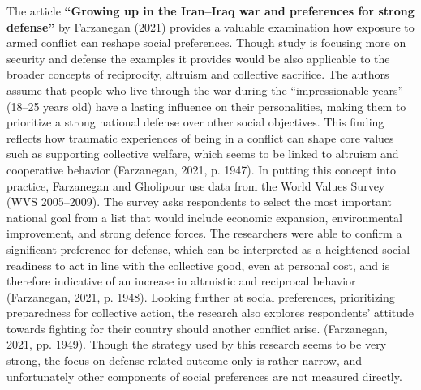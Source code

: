 \documentclass[14pt]{article}
\theoremstyle{remark}
\begin{document}
The article \textbf{``Growing up in the Iran--Iraq war and preferences for strong defense''} by Farzanegan (2021) provides a valuable examination how exposure to armed conflict can reshape social preferences. Though study is focusing more on security and defense the examples it provides would be also applicable to the broader concepts of reciprocity, altruism and collective sacrifice. The authors assume that people who live through the war during the ``impressionable years'' (18--25 years old) have a lasting influence on their personalities, making them to prioritize a strong national defense over other social objectives. This finding reflects how traumatic experiences of being in a conflict can shape core values such as supporting collective welfare, which seems to be linked to altruism and cooperative behavior (Farzanegan, 2021, p. 1947). In putting this concept into practice, Farzanegan and Gholipour use data from the World Values Survey (WVS 2005--2009). The survey asks respondents to select the most important national goal from a list that would include economic expansion, environmental improvement, and strong defence forces. The researchers were able to confirm a significant preference for defense, which can be interpreted as a heightened social readiness to act in line with the collective good, even at personal cost, and is therefore indicative of an increase in altruistic and reciprocal behavior (Farzanegan, 2021, p. 1948). Looking further at social preferences, prioritizing preparedness for collective action, the research also explores respondents' attitude towards fighting for their country should another conflict arise. (Farzanegan, 2021, pp. 1949). Though the strategy used by this research seems to be very strong, the focus on defense-related outcome only is rather narrow, and unfortunately other components of social preferences are not measured directly.
\end{document}

